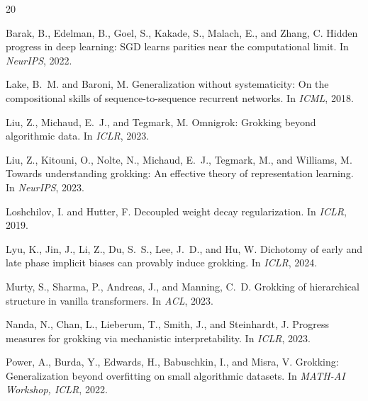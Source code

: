 \documentclass[11pt]{article}
\begin{document}
\clearpage
\begin{thebibliography}{20}

Barak, B., Edelman, B., Goel, S., Kakade, S., Malach, E., and Zhang, C.
\newblock Hidden progress in deep learning: SGD learns parities near the computational limit.
\newblock In \emph{NeurIPS}, 2022.

Lake, B.~M. and Baroni, M.
\newblock Generalization without systematicity: On the compositional skills of sequence-to-sequence recurrent networks.
\newblock In \emph{ICML}, 2018.

Liu, Z., Michaud, E.~J., and Tegmark, M.
\newblock Omnigrok: Grokking beyond algorithmic data.
\newblock In \emph{ICLR}, 2023.

Liu, Z., Kitouni, O., Nolte, N., Michaud, E.~J., Tegmark, M., and Williams, M.
\newblock Towards understanding grokking: An effective theory of representation learning.
\newblock In \emph{NeurIPS}, 2023.

Loshchilov, I. and Hutter, F.
\newblock Decoupled weight decay regularization.
\newblock In \emph{ICLR}, 2019.

Lyu, K., Jin, J., Li, Z., Du, S.~S., Lee, J.~D., and Hu, W.
\newblock Dichotomy of early and late phase implicit biases can provably induce grokking.
\newblock In \emph{ICLR}, 2024.

Murty, S., Sharma, P., Andreas, J., and Manning, C.~D.
\newblock Grokking of hierarchical structure in vanilla transformers.
\newblock In \emph{ACL}, 2023.

Nanda, N., Chan, L., Lieberum, T., Smith, J., and Steinhardt, J.
\newblock Progress measures for grokking via mechanistic interpretability.
\newblock In \emph{ICLR}, 2023.

Power, A., Burda, Y., Edwards, H., Babuschkin, I., and Misra, V.
\newblock Grokking: Generalization beyond overfitting on small algorithmic datasets.
\newblock In \emph{MATH-AI Workshop, ICLR}, 2022.


\end{thebibliography}
\end{document}
